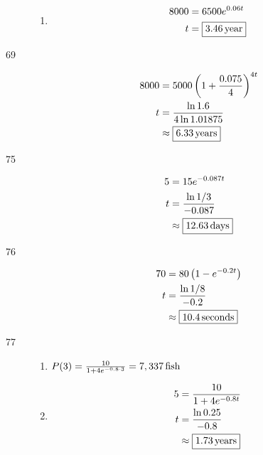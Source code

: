 \documentclass{exam}
\begin{document}
\begin{description}
\begin{enumerate}[a]
          \item
            \begin{align*}
              8000 &= 6500 e^{0.06 t} \\
              t     &= \boxed{\unit[3.46]{year}} \\
            \end{align*}
        \end{enumerate}

      \item[69]
        \begin{align*}
          8000    &= 5000 \left( 1 + \frac{0.075}{4} \right)^{4t} \\
          t       &= \frac{\ln 1.6}{4 \ln 1.01875} \\
                  &\approx \boxed{\unit[6.33]{years}} \\
        \end{align*}

      \item[75]
        \begin{align*}
          5 &= 15 e^{-0.087t} \\
          t &= \frac{\ln 1/3}{-0.087} \\
            &\approx \boxed{\unit[12.63]{days}} \\
        \end{align*}

      \item[76]
        \begin{align*}
          70          &= 80 \left( 1 - e^{-0.2t} \right) \\
          t           &= \frac{\ln 1/8}{-0.2} \\
                      &\approx \boxed{\unit[10.4]{seconds}} \\
        \end{align*}

      \item[77]
        \begin{enumerate}[a]
          \item $P(3) = \frac{10}{1 + 4e^{-0.8 \cdot 3}} = \unit[7,337]{fish}$

          \item 
            \begin{align*}
              5 &= \frac{10}{1 + 4e^{-0.8t}} \\
              t &= \frac{\ln 0.25}{-0.8} \\
                &\approx \boxed{\unit[1.73]{years}} \\
            \end{align*}
        \end{enumerate}


\end{description}
\end{document}
